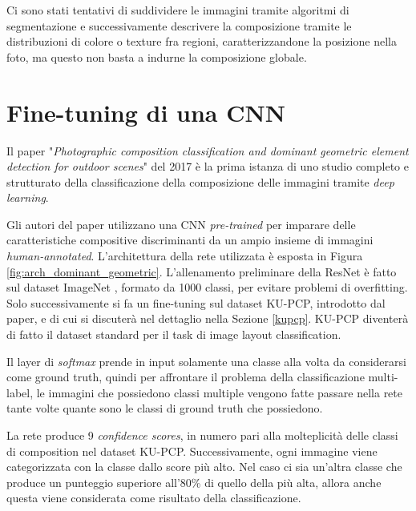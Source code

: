 Ci sono stati tentativi di suddividere le immagini tramite algoritmi di segmentazione e successivamente descrivere la composizione tramite le distribuzioni di colore o texture fra regioni, caratterizzandone la posizione nella foto, ma questo non basta a indurne la composizione globale.

\section{Fine-tuning di una CNN}
Il paper "\textit{Photographic composition classification and dominant geometric element detection for outdoor scenes}" \cite{composition_dominant_geometric} del 2017 è la prima istanza di uno studio completo e strutturato della classificazione della composizione delle immagini tramite \textit{deep learning}. 

Gli autori del paper utilizzano una CNN \textit{pre-trained} per imparare delle caratteristiche compositive discriminanti da un ampio insieme di immagini \textit{human-annotated}. L'architettura della rete utilizzata è esposta in Figura \ref{fig:arch_dominant_geometric}. L'allenamento preliminare della ResNet è fatto sul dataset ImageNet \cite{imagenet}, formato da 1000 classi, per evitare problemi di overfitting. Solo successivamente si fa un fine-tuning sul dataset KU-PCP, introdotto dal paper, e di cui si discuterà nel dettaglio nella Sezione \ref{kupcp}. KU-PCP diventerà di fatto il dataset standard per il task di image layout classification.

Il layer di \textit{softmax} prende in input solamente una classe alla volta da considerarsi come ground truth, quindi per affrontare il problema della classificazione multi-label, le immagini che possiedono classi multiple vengono fatte passare nella rete tante volte quante sono le classi di ground truth che possiedono.

La rete produce 9 \textit{confidence scores}, in numero pari alla molteplicità delle classi di composition nel dataset KU-PCP. Successivamente, ogni immagine viene categorizzata con la classe dallo score più alto. Nel caso ci sia un'altra classe che produce un punteggio superiore all'80\% di quello della più alta, allora anche questa viene considerata come risultato della classificazione.

